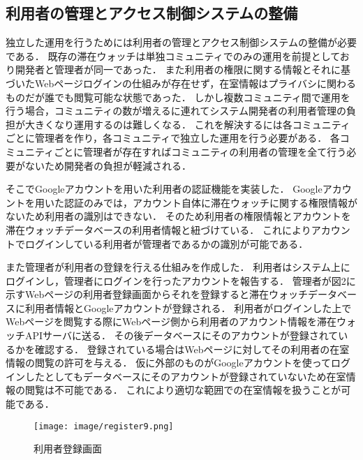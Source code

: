
\subsection{利用者の管理とアクセス制御システムの整備}
独立した運用を行うためには利用者の管理とアクセス制御システムの整備が必要である．
既存の滞在ウォッチは単独コミュニティでのみの運用を前提としており開発者と管理者が同一であった．
また利用者の権限に関する情報とそれに基づいたWebページログインの仕組みが存在せず，在室情報はプライバシに関わるものだが誰でも閲覧可能な状態であった．
しかし複数コミュニティ間で運用を行う場合，コミュニティの数が増えるに連れてシステム開発者の利用者管理の負担が大きくなり運用するのは難しくなる．
これを解決するには各コミュニティごとに管理者を作り，各コミュニティで独立した運用を行う必要がある．
各コミュニティごとに管理者が存在すればコミュニティの利用者の管理を全て行う必要がないため開発者の負担が軽減される．

そこでGoogleアカウントを用いた利用者の認証機能を実装した．
Googleアカウントを用いた認証のみでは，アカウント自体に滞在ウォッチに関する権限情報がないため利用者の識別はできない．
そのため利用者の権限情報とアカウントを滞在ウォッチデータベースの利用者情報と紐づけている．
これによりアカウントでログインしている利用者が管理者であるかの識別が可能である．

また管理者が利用者の登録を行える仕組みを作成した．
利用者はシステム上にログインし，管理者にログインを行ったアカウントを報告する．
管理者が図2に示すWebページの利用者登録画面からそれを登録すると滞在ウォッチデータベースに利用者情報とGoogleアカウントが登録される．
利用者がログインした上でWebページを閲覧する際にWebページ側から利用者のアカウント情報を滞在ウォッチAPIサーバに送る．
その後データベースにそのアカウントが登録されているかを確認する．
登録されている場合はWebページに対してその利用者の在室情報の閲覧の許可を与える．
仮に外部のものがGoogleアカウントを使ってログインしたとしてもデータベースにそのアカウントが登録されていないため在室情報の閲覧は不可能である．
これにより適切な範囲での在室情報を扱うことが可能である．


\begin{figure}[tbh]
  \centering
  \texttt{[image: image/register9.png]}
  \caption{利用者登録画面}
  \label{multipleBPM}
\end{figure}